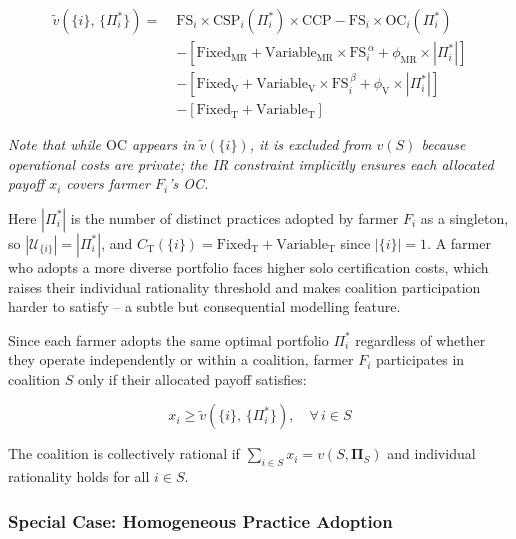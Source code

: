 \documentclass[manuscript, screen]{acmart}
\begin{document}
\begin{equation}
\begin{split}
\tilde{v}\!\left(\{i\},\, \{\Pi_i^*\}\right) = \;
    & \text{FS}_i \times \text{CSP}_i(\Pi_i^*) \times \text{CCP}
      - \text{FS}_i \times \text{OC}_i(\Pi_i^*) \\
    & - \left[\text{Fixed}_{\text{MR}} + \text{Variable}_{\text{MR}} \times \text{FS}_i^{\,\alpha}
        + \phi_{\text{MR}} \times |\Pi_i^*|\right] \\
    & - \left[\text{Fixed}_{\text{V}} + \text{Variable}_{\text{V}} \times \text{FS}_i^{\,\beta}
        + \phi_{\text{V}} \times |\Pi_i^*|\right] \\
    & - \left[\text{Fixed}_{\text{T}} + \text{Variable}_{\text{T}}\right]
\end{split}
\end{equation}

\textit{Note that while $\text{OC}$ appears in $\tilde{v}(\{i\})$, it is
excluded from $v(S)$ because operational costs are private; the IR constraint
implicitly ensures each allocated payoff $x_i$ covers farmer $F_i$'s OC.}

Here $|\Pi_i^*|$ is the number of distinct practices adopted by farmer $F_i$
as a singleton, so $|\mathcal{U}_{\{i\}}| = |\Pi_i^*|$, and
$C_{\text{T}}(\{i\}) = \text{Fixed}_{\text{T}} + \text{Variable}_{\text{T}}$
since $|\{i\}| = 1$. A farmer who adopts a more diverse portfolio faces higher
solo certification costs, which raises their individual rationality threshold
and makes coalition participation harder to satisfy -- a subtle but
consequential modelling feature.

Since each farmer adopts the same optimal portfolio $\Pi_i^*$ regardless of
whether they operate independently or within a coalition, farmer $F_i$
participates in coalition $S$ only if their allocated payoff satisfies:

\begin{equation}
    x_i \geq \tilde{v}\!\left(\{i\},\, \{\Pi_i^*\}\right), \quad \forall\, i \in S
\end{equation}

The coalition is collectively rational if $\sum_{i \in S} x_i =
v(S, \boldsymbol{\Pi}_S)$ and individual rationality holds for all $i \in S$.

\subsubsection*{Special Case: Homogeneous Practice Adoption}
\end{document}

